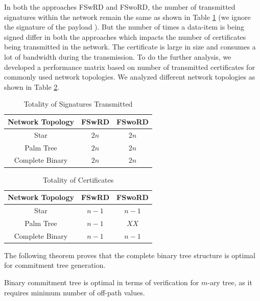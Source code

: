 		In both the approaches FSwRD and FSwoRD, the number of transmitted signatures within the network remain the same as shown in Table \ref{tab:analysis-table-1} (we ignore the signature of the payload ). 
		But the number of times a data-item is being signed differ in both the approaches which impacts the number of certificates being transmitted in the network.
		The certificate is large in size and consumes a lot of bandwidth during the transmission.
		To do the further analysis, we developed a performance matrix based on number of transmitted certificates for commonly used network topologies.
		We analyzed different network topologies as shown in Table \ref{tab:analysis-table-2}. 
		\begin{table}[!htb]
			\begin{center}
				\caption{Totality of Signatures Transmitted}
				\label{tab:analysis-table-1}
				\begin{tabular}{|c||c|c|}
					\hline
					Network Topology & FSwRD & FSwoRD \\ 
					\hline
					\hline
					Star & $2n$ & $2n$ \\
					\hline
					Palm Tree & $2n$ & $2n$\\
					\hline
					Complete Binary & $2n$ & $2n$\\
					\hline
				\end{tabular}
			\end{center}
		\end{table}

		\begin{table}[!htb]
			\begin{center}
				\caption{Totality of Certificates}
				\label{tab:analysis-table-2}
				\begin{tabular}{|c||c|c|}
					\hline
					Network Topology & FSwRD & FSwoRD \\
					\hline
					\hline
					Star & $n - 1$ & $n -1$ \\
					\hline
					Palm Tree & $n - 1$ & $XX$\\
					\hline
					Complete Binary & $n - 1$ & $n - 1$\\
					\hline
				\end{tabular}
			\end{center}
		\end{table}
	The following theorem proves that the complete binary tree structure is optimal for commitment tree generation.
	\begin{theorem}
		\label{the:ct}
		Binary commitment tree is optimal in terms of verification for $m$-ary tree, as it requires minimum number of off-path values.
	\end{theorem}

